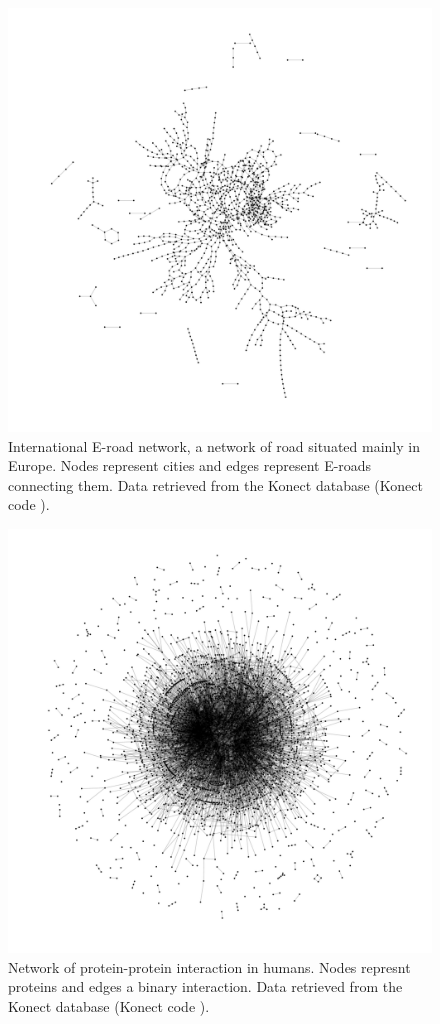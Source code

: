 \documentclass[
11pt, %
english, %
singlespacing, %
nolistspacing, %
liststotoc, %
headsepline, %
]{MastersDoctoralThesis} %
\begin{document}
\begin{figure}
	\includegraphics[width=\textwidth]{network-subelj_euroroad.pdf}
	\caption{International E-road network, a network of road situated mainly in Europe. Nodes represent cities and edges represent E-roads connecting them. Data retrieved from the Konect database \cite{kunegis2013konect} (Konect code ).}
	\label{Figure: Network euroroad}
\end{figure}

\begin{figure}
	\includegraphics[width=\textwidth]{network-maayan-vidal.pdf}
	\caption{Network of protein-protein interaction in humans. Nodes represnt proteins and edges a binary interaction. Data retrieved from the Konect database \cite{kunegis2013konect} (Konect code ).}
	\label{Figure: Network of human proteins}
\end{figure}
\end{document}
